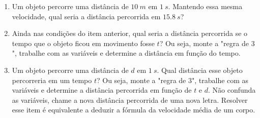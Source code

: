 \documentclass[12pt]{report}
\newcommand{\1}{\faThermometerEmpty}
\newcommand{\2}{\faThermometerQuarter}
\newcommand{\3}{\faThermometerHalf}
\newcommand{\4}{\faThermometerThreeQuarters}
\newcommand{\5}{\faThermometerFull}
\begin{document}
\begin{enumerate}
\begin{enumerate}
\item Um objeto percorre uma distância de $10\ m$ em $1\ s$. Mantendo essa mesma velocidade, qual seria a distância percorrida em $15.8\ s$?
\item \2 Ainda nas condições do item anterior, qual seria a distância percorrida se o tempo que o objeto ficou em movimento fosse $t$? Ou seja, monte a "regra de $3$", trabalhe com as variáveis e determine a distância em função do tempo.
\item \3 Um objeto percorre uma distância de $d$ em $1\ s$. Qual distância esse objeto percorreria em um tempo $t$? Ou seja, monte a "regra de $3$", trabalhe com as variáveis e determine a distância percorrida em função de $t$ e $d$. Não confunda as variáveis, chame a nova distância percorrida de uma nova letra. Resolver esse item é equivalente a deduzir a fórmula da velocidade média de um corpo. 

\end{enumerate}


\end{enumerate}
\end{document}
